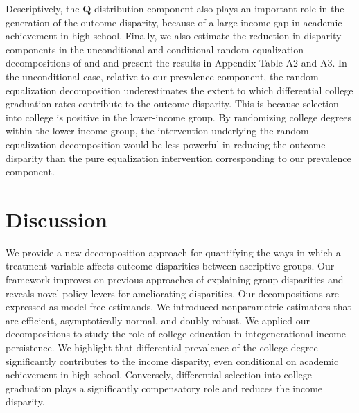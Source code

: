 \documentclass[12pt,a4paper]{article}
\def\Q{{\boldsymbol Q}}
\begin{document}
Descriptively, the $\Q$ distribution component also plays an important role in the generation of the outcome disparity, because of a large income gap in academic achievement in high school. Finally, we also estimate the reduction in disparity components in the unconditional and conditional random equalization decompositions of \citet{jackson_decomposition_2018} and \citet{jackson_meaningful_2021} and present the results in Appendix Table A2 and A3. In the unconditional case, relative to our prevalence component, the random equalization decomposition underestimates the extent to which differential college graduation rates contribute to the outcome disparity. This is because selection into college is positive in the lower-income group. By randomizing college degrees within the lower-income group, the intervention underlying the random equalization decomposition would be less powerful in reducing the outcome disparity than the pure equalization intervention corresponding to our prevalence component. 

\section{Discussion}
We provide a new decomposition approach for quantifying the ways in which a treatment variable affects outcome disparities between ascriptive groups. Our framework improves on previous approaches of explaining group disparities and reveals novel policy levers for ameliorating disparities. Our decompositions are expressed as model-free estimands. We introduced nonparametric estimators that are efficient, asymptotically normal, and doubly robust. We applied our decompositions to study the role of college education in integenerational income persistence. We highlight that differential prevalence of the college degree significantly contributes to the income disparity, even conditional on academic achievement in high school. Conversely, differential selection into college graduation plays a significantly compensatory role and reduces the income disparity.
\end{document}
